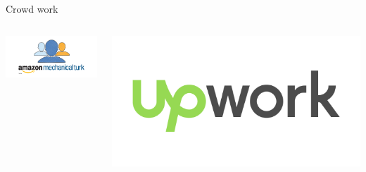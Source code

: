 \documentclass[presentation]{subfiles}
\begin{document}
\begin{frame}
    \begin{columns}[b]
      \begin{column}[t]{0.45\textwidth}
        \centering
        Crowd work
        \begin{columns}
          \begin{column}[b]{.5\textwidth}
            \includegraphics[max width=\linewidth,max height=\textheight,keepaspectratio]{../common_figures/amt.png}
          \end{column}
          \begin{column}[b]{.5\textwidth}
            \includegraphics[max width=\linewidth,max height=\textheight,keepaspectratio]{../common_figures/upwork.png}
          \end{column}
        \end{columns}
      \end{column}


\end{columns}
\end{frame}
\end{document}
